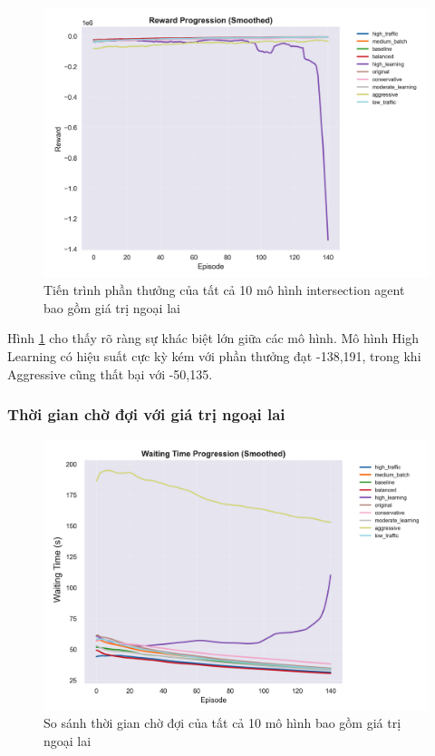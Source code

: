 \begin{figure}[!htp]
    \centering
    \includegraphics[width=\textwidth]{
        figures/individual_plots/intersection_full_reward_progress.png
    }
    \caption{Tiến trình phần thưởng của tất cả 10 mô hình intersection agent bao gồm giá trị ngoại lai}
    \label{fig:intersection_full_reward_progress}
\end{figure}

Hình \ref{fig:intersection_full_reward_progress} cho thấy rõ ràng sự khác biệt lớn
giữa các mô hình. Mô hình High Learning có hiệu suất cực kỳ kém với phần thưởng đạt -138,191,
trong khi Aggressive cũng thất bại với -50,135.

\subsubsection{Thời gian chờ đợi với giá trị ngoại lai}

\begin{figure}[!htp]
    \centering
    \includegraphics[width=\textwidth]{
        figures/individual_plots/intersection_full_waiting_time.png
    }
    \caption{So sánh thời gian chờ đợi của tất cả 10 mô hình bao gồm giá trị ngoại lai}
    \label{fig:intersection_full_waiting_time}
\end{figure}


